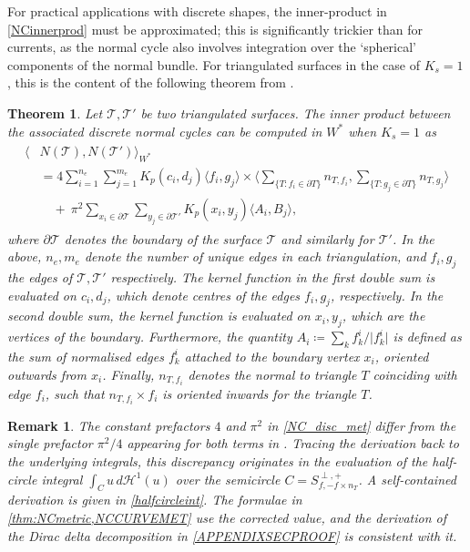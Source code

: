 \documentclass[sn-mathphys-num]{sn-jnl}%
\theoremstyle{thmstyleone}%
\newtheorem{thm}[theorem]{Theorem}
\theoremstyle{thmstyletwo}%
\newtheorem{remark}{Remark}%
\theoremstyle{thmstylethree}%
\numberwithin{remark}{section}
\numberwithin{definition}{section}
\numberwithin{equation}{section}
\numberwithin{theorem}{section}
\begin{document}
For practical applications with discrete shapes,  the inner-product in \cref{NCinnerprod}  must be approximated; this is significantly trickier than for currents, as the normal cycle also involves integration over the `spherical' components of the normal bundle. For triangulated surfaces in the case of $K_{s} = 1$, this is the content of the following theorem from \cite{NCpaper}.
\begin{thm} \label{thm:NCmetric}
    Let $\mathcal{T},\mathcal{T}'$ be two triangulated surfaces. The inner product between the associated discrete normal cycles can be computed in $W^{*}$ when $K_{s}=1$ as
    \begin{gather}\begin{split}\label{NC_disc_met}
        \langle &N(\mathcal{T}),N(\mathcal{T}') \rangle_{W^{*}} \\&=
        4\sum_{i=1}^{n_{e}}\sum_{j=1}^{m_{e}}{K_{p}(c_{i},d_{j})\langle f_{i},g_{j}\rangle}
        \times\bigg\langle \sum_{\{T\colon f_{i}\in \partial T\}}{n_{T,f_{i}}}, \sum_{\{T\colon g_{j}\in \partial T\}}{n_{T,g_{j}}}\bigg\rangle 
        \\&\quad+ \ \pi^2\sum_{x_{i}\in\partial \mathcal{T}}\sum_{y_j\in \partial \mathcal{T}'}{K_{p}(x_{i},y_{j})\langle A_{i},B_{j}\rangle},
    \end{split}\end{gather}
where $\partial \mathcal{T}$ denotes the boundary of the surface $\mathcal{T}$ and similarly for $\mathcal{T}'$. In the above, $n_{e},m_{e}$ denote the number of unique edges in each triangulation, and $f_{i},g_{j}$ the edges of $\mathcal T, \mathcal T'$ respectively. The kernel function in the first double sum is evaluated on $c_{i},d_{j}$, which denote centres of the edges $f_{i},g_{j}$, respectively. In the second double sum, the kernel function is evaluated on $x_{i},y_{j}$, which are the vertices of the boundary. Furthermore, the quantity $A_{i} \coloneq \sum_{k}{f_{k}^{i}/\lvert f_{k}^{i}\rvert}$ is defined as the sum of normalised edges $f^i_k$ attached to the boundary vertex $x_{i}$, oriented outwards from $x_{i}$. Finally, $n_{T,f_{i}}$ denotes the normal to triangle $T$ coinciding with edge $f_{i}$, such that $n_{T,f_{i}}\times f_{i}$ is oriented inwards for the triangle $T$.
 \end{thm}

\begin{remark}\label{rem:coefficient_discrepancy}
The constant prefactors $4$ and $\pi^{2}$ in \cref{NC_disc_met} differ from the single prefactor $\pi^{2}/4$ appearing for both terms in \cite[Prop.~3]{NCpaper}. Tracing the derivation back to the underlying integrals, this discrepancy originates in the evaluation of the half-circle integral $\int_{C}u\,d\mathcal{H}^{1}(u)$ over the semicircle $C=S^{\perp,+}_{f,-f\times n_{T}}$. A self-contained derivation is given in \cref{halfcircleint}. The formulae in \cref{thm:NCmetric,NCCURVEMET} use the corrected value, and the derivation of the Dirac delta decomposition in \cref{APPENDIXSECPROOF} is consistent with it.
\end{remark}
\end{document}
